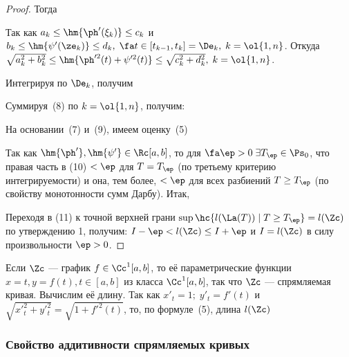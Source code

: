 \documentclass[a4paper]{article}
\begin{document}
\begin{proof}
Тогда 

Так как $a_k \le \hm{\ph'(\xi_k)} \le c_k$ и $b_k \le
\hm{\psi'(\ze_k)} \le d_k,\;\fa  t\in
[t_{k-1},t_k]=\De_k,\;k=\ol{1,n}$. Откуда $\sqrt{ a_k^2 +
b_k ^ 2} \le \hm{\ph'^2 (t) + \psi'^2 (t)} \le \sqrt{c_k^2 +
d_k^2},\; k=\ol{1,n}$.

Интегрируя по $\De_k$, получим 

Суммируя~(8) по $k=\ol{1,n}$, получим:


На основании~(7) и~(9), имеем оценку~(5) 

Так как $\hm{\ph'},\hm{\psi'}\in\Rc[a,b]$, то для
$\fa \ep>0\;\exists T_{\ep} \in \Ps_0$, что правая часть в (10)
$<\ep$ для $T=T_{\ep}$ (по третьему критерию интегрируемости) и она,
тем более, $<\ep$ для всех разбиений $T\ge T_{\ep}$ (по свойству
монотонности сумм Дарбу). Итак, 

Переходя в (11) к точной верхней грани $\sup \hc{l(\La(T))\;|\; T
\ge T_{\ep}} = l(\Zc)$ по утверждению 1, получим: $I-\ep < l(\Zc)
\le I+\ep$ и $I=l(\Zc)$ в силу произвольности $\ep>0$.
\end{proof}

Если $\Zc$ --- график $f\in\Cc^{1}[a,b]$, то её параметрические
функции $x=t,y=f(t), t\in[a,b]$ из класса $\Cc^1[a,b]$, так что
$\Zc$ --- спрямляемая кривая. Вычислим её длину. Так как $x'_t =
1;\;y'_t = f'(t)$ и $\sqrt{x'^2_t + y'^2_t} = \sqrt{ 1 + f'^2 (t)}$,
то, по формуле~(5), длина $l(\Zc)$ 

\subsubsection{Свойство аддитивности спрямляемых кривых}
\end{document}
